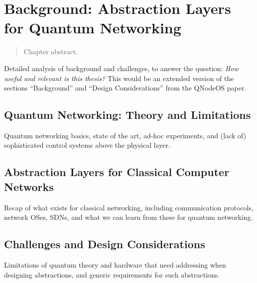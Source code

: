 \chapter{Background: Abstraction Layers for Quantum Networking}
\label{chp:background}

\begin{refsection}

\begin{abstract}
Chapter abstract.
\end{abstract}

\newpage

\noindent
Detailed analysis of background and challenges, to answer the question: \emph{How useful and
relevant is this thesis?} This would be an extended version of the sections ``Background'' and
``Design Considerations'' from the QNodeOS paper.

\section{Quantum Networking: Theory and Limitations}

Quantum networking basics, state of the art, ad-hoc experiments, and (lack of) sophisticated control
systems above the physical layer.

\section{Abstraction Layers for Classical Computer Networks}

Recap of what exists for classical networking, including communication protocols, network OSes,
SDNs, and what we can learn from these for quantum networking.

\section{Challenges and Design Considerations}

Limitations of quantum theory and hardware that need addressing when designing abstractions, and
generic requirements for such abstractions.

\printbibliography[heading=subbibintoc,title={References}]

\end{refsection}
